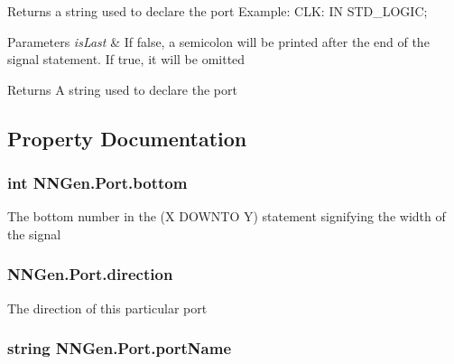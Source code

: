 Returns a string used to declare the port Example\+: C\+L\+K\+: I\+N S\+T\+D\+\_\+\+L\+O\+G\+I\+C; 


\begin{DoxyParams}{Parameters}
{\em is\+Last} & If false, a semicolon will be printed after the end of the signal statement. If true, it will be omitted\\
\hline
\end{DoxyParams}
\begin{DoxyReturn}{Returns}
A string used to declare the port
\end{DoxyReturn}


\subsection{Property Documentation}
\hypertarget{class_n_n_gen_1_1_port_a7bf74261a0fc7d2574c45332a301dcb3}{}
\subsubsection[{bottom}]{\setlength{\rightskip}{0pt plus 5cm}int N\+N\+Gen.\+Port.\+bottom\hspace{0.3cm}{\ttfamily [get]}}\label{class_n_n_gen_1_1_port_a7bf74261a0fc7d2574c45332a301dcb3}


The bottom number in the (X D\+O\+W\+N\+T\+O Y) statement signifying the width of the signal 

\hypertarget{class_n_n_gen_1_1_port_a68b34b101d99494b7fa7bcb78608a6bf}{}
\subsubsection[{direction}]{ N\+N\+Gen.\+Port.\+direction\hspace{0.3cm}{\ttfamily [get]}}\label{class_n_n_gen_1_1_port_a68b34b101d99494b7fa7bcb78608a6bf}


The direction of this particular port 

\hypertarget{class_n_n_gen_1_1_port_a0fc8ebe56a544edec825980f9961ed6d}{}
\subsubsection[{port\+Name}]{\setlength{\rightskip}{0pt plus 5cm}string N\+N\+Gen.\+Port.\+port\+Name\hspace{0.3cm}{\ttfamily [get]}}\label{class_n_n_gen_1_1_port_a0fc8ebe56a544edec825980f9961ed6d}


